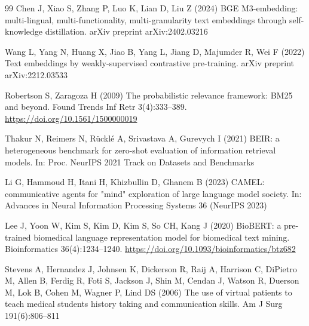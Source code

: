 \documentclass[pdflatex,sn-mathphys-num]{sn-jnl}
\theoremstyle{thmstyleone}
\theoremstyle{thmstyletwo}
\theoremstyle{thmstylethree}
\begin{document}
\begin{thebibliography}{99}
Chen J, Xiao S, Zhang P, Luo K, Lian D, Liu Z (2024) BGE M3-embedding: multi-lingual, multi-functionality, multi-granularity text embeddings through self-knowledge distillation. arXiv preprint arXiv:2402.03216

Wang L, Yang N, Huang X, Jiao B, Yang L, Jiang D, Majumder R, Wei F (2022) Text embeddings by weakly-supervised contrastive pre-training. arXiv preprint arXiv:2212.03533

Robertson S, Zaragoza H (2009) The probabilistic relevance framework: BM25 and beyond. Found Trends Inf Retr 3(4):333--389. \url{https://doi.org/10.1561/1500000019}

Thakur N, Reimers N, R\"{u}ckl\'{e} A, Srivastava A, Gurevych I (2021) BEIR: a heterogeneous benchmark for zero-shot evaluation of information retrieval models. In: Proc. NeurIPS 2021 Track on Datasets and Benchmarks

Li G, Hammoud H, Itani H, Khizbullin D, Ghanem B (2023) CAMEL: communicative agents for "mind" exploration of large language model society. In: Advances in Neural Information Processing Systems 36 (NeurIPS 2023)

Lee J, Yoon W, Kim S, Kim D, Kim S, So CH, Kang J (2020) BioBERT: a pre-trained biomedical language representation model for biomedical text mining. Bioinformatics 36(4):1234--1240. \url{https://doi.org/10.1093/bioinformatics/btz682}

Stevens A, Hernandez J, Johnsen K, Dickerson R, Raij A, Harrison C, DiPietro M, Allen B, Ferdig R, Foti S, Jackson J, Shin M, Cendan J, Watson R, Duerson M, Lok B, Cohen M, Wagner P, Lind DS (2006) The use of virtual patients to teach medical students history taking and communication skills. Am J Surg 191(6):806--811

\end{thebibliography}
\end{document}

